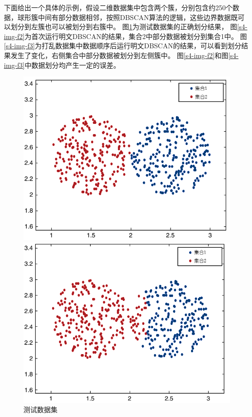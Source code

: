 下面给出一个具体的示例，假设二维数据集中包含两个簇，分别包含约250个数据，球形簇中间有部分数据相邻，按照DBSCAN算法的逻辑，这些边界数据既可以划分到左簇也可以被划分到右簇中。
图\ref{s4-img-f1}为测试数据集的正确划分结果，
图\ref{s4-img-f2}为首次运行明文DBSCAN的结果，集合2中部分数据被划分到集合1中。
图\ref{s4-img-f3}为打乱数据集中数据顺序后运行明文DBSCAN的结果，可以看到划分结果发生了变化，右侧集合中部分数据被划分到左侧簇中。
图\ref{s4-img-f2}和图\ref{s4-img-f3}中数据划分均产生一定的误差。

\begin{figure}[htbp] %
	\begin{minipage}[t]{0.3\linewidth}
		\includegraphics[width=\linewidth]{img/expr.png}
		\caption{测试数据集}
		\label{s4-img-f1}
	\end{minipage}%
	\hfill%
	\begin{minipage}[t]{0.3\linewidth}
		\includegraphics[width=\linewidth]{img/expr2.png}

\end{minipage}
\end{figure}
